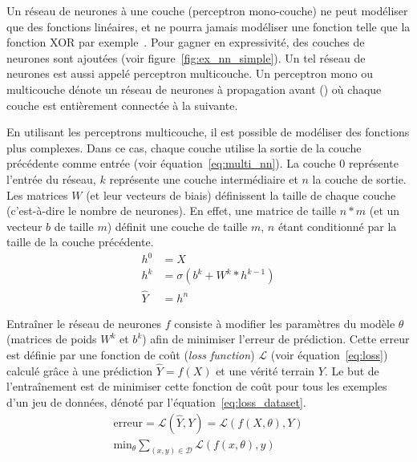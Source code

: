 Un réseau de neurones à une couche (perceptron mono-couche) ne peut modéliser que des fonctions linéaires, et ne pourra jamais modéliser une fonction telle que la fonction XOR par exemple~\cite{minsky_perceptrons_1988}.
Pour gagner en expressivité, des couches de neurones sont ajoutées (voir figure~\ref{fig:ex_nn_simple}). Un tel réseau de neurones est aussi appelé perceptron multicouche.
%
Un perceptron mono ou multicouche dénote un réseau de neurones à propagation avant () où chaque couche est entièrement connectée à la suivante.

En utilisant les perceptrons multicouche, il est possible de modéliser des fonctions plus complexes.
Dans ce cas, chaque couche utilise la sortie de la couche précédente comme entrée (voir équation~\ref{eq:multi_nn}).
La couche \num{0} représente l'entrée du réseau, $k$ représente une couche intermédiaire et $n$ la couche de sortie.
Les matrices $W$ (et leur vecteurs de biais) définissent la taille de chaque couche (c'est-à-dire le nombre de neurones).
En effet, une matrice de taille $n*m$ (et un vecteur $b$ de taille $m$) définit une couche de taille $m$, $n$ étant conditionné par la taille de la couche précédente.
%
\begin{equation}\label{eq:multi_nn}
  \begin{split}
    h^0 & = X \\
    h^k & = \sigma(b^k + W^k * h^{k-1}) \\
    \hat{Y} & = h^n
  \end{split}
\end{equation}

Entraîner le réseau de neurones $f$ consiste à modifier les paramètres du modèle $\theta$ (matrices de poids $W^k$ et $b^k$) afin de minimiser l'erreur de prédiction. Cette erreur est définie par une fonction de coût (\emph{loss function}) $\mathcal{L}$ (voir équation~\ref{eq:loss}) calculé grâce à une prédiction $\hat{Y} = f(X)$ et une vérité terrain $Y$.
Le but de l'entraînement est de minimiser cette fonction de coût pour tous les exemples d'un jeu de données, dénoté par l'équation~\ref{eq:loss_dataset}.
%
\begin{gather} 
    \text{erreur} = \mathcal{L}(\hat{Y}, Y) = \mathcal{L}(f(X, \theta), Y) \label{eq:loss} \\
    \text{min}_\theta \sum_{(x, y) \in \mathcal{D}} \mathcal{L}(f(x, \theta), y) \label{eq:loss_dataset}
\end{gather}

